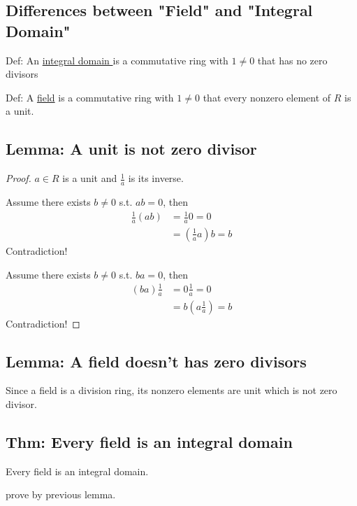 \documentclass[11pt]{elegantbook}
\begin{document}
\subsection{Differences between "Field" and "Integral Domain"}
Def: An \underline{integral domain
} is a commutative ring with $1\neq 0$ that has no zero divisors

Def: A \underline{field} is a commutative ring with $1\neq 0$ that every nonzero element of $R$ is a unit.

\subsection{Lemma: A unit is not zero divisor}
\begin{proof}
    $a\in R$ is a unit and $\frac{1}{a}$ is its inverse.

    Assume there exists $b\neq 0$ s.t. $ab=0$, then
    \begin{equation}
        \begin{aligned}
            \frac{1}{a}(ab)&=\frac{1}{a}0=0\\
            &=(\frac{1}{a}a)b=b
        \end{aligned}
        \nonumber
    \end{equation}
    Contradiction!

    Assume there exists $b\neq 0$ s.t. $ba=0$, then
    \begin{equation}
        \begin{aligned}
            (ba)\frac{1}{a}&=0\frac{1}{a}=0\\
            &=b(a\frac{1}{a})=b
        \end{aligned}
        \nonumber
    \end{equation}
    Contradiction!
\end{proof}
\subsection{Lemma: A field doesn't has zero divisors}
Since a field is a division ring, its nonzero elements are unit which is not zero divisor.

\subsection{Thm: Every field is an integral domain}
\begin{theorem}
    Every field is an integral domain.
\end{theorem}
prove by previous lemma.
\end{document}
